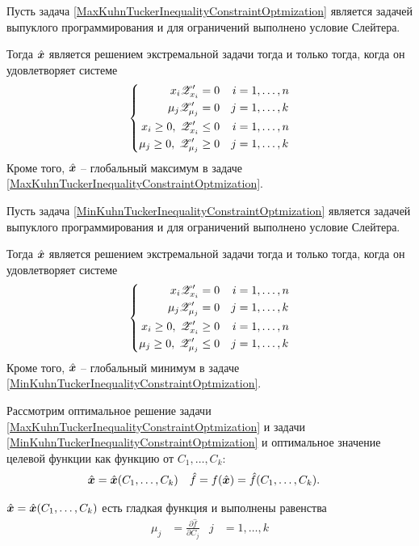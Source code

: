 \begin{teorema}%
Пусть задача \eqref{MaxKuhnTuckerInequalityConstraintOptmization} 
является задачей выпуклого программирования и для ограничений выполнено условие Слейтера.

Тогда $\hat{{\bm x}}$ является решением экстремальной 
задачи тогда и только тогда, когда он удовлетворяет системе 
\begin{equation}\label{MaxKuhnTuckerSystem}
	\left\{\begin{aligned}
	x_i {\mathscr Z}'_{x_i}&=0 &  i&=1,\ldots,n \\
	\mu_j{\mathscr Z}'_{\mu_j}&=0 &  j&=1,\ldots,k\\
	x_i\geq0,\; {\mathscr Z}'_{x_i}&\leq0 &  i&=1,\ldots,n \\
	\mu_j\geq0,\; {\mathscr Z}'_{\mu_j}&\geq 0 &  j&=1,\ldots,k
	\end{aligned}\right.
\end{equation}
Кроме того, $\hat{{\bm x}}$ -- глобальный максимум в задаче  \eqref{MaxKuhnTuckerInequalityConstraintOptmization}.
\end{teorema}

\begin{teorema}%
Пусть задача \eqref{MinKuhnTuckerInequalityConstraintOptmization} 
является задачей выпуклого программирования и для ограничений выполнено условие Слейтера.

Тогда $\hat{{\bm x}}$ является решением экстремальной 
задачи тогда и только тогда, когда он удовлетворяет системе 
\begin{equation}\label{MinKuhnTuckerSystem}
	\left\{\begin{aligned}
	x_i{\mathscr Z}'_{x_i}&=0 & i&=1,\ldots,n \\
	\mu_j{\mathscr Z}'_{\mu_j}&=0 & j&=1,\ldots,k \\
	x_i\geq0,\; {\mathscr Z}'_{x_i}&\geq0 & i&=1,\ldots,n \\
	\mu_j\geq0,\; {\mathscr Z}'_{\mu_j}& \leq0 & j&=1,\ldots,k 
	\end{aligned}\right.
\end{equation}
Кроме того, $\hat{{\bm x}}$ -- глобальный минимум в задаче  \eqref{MinKuhnTuckerInequalityConstraintOptmization}.
\end{teorema}
Рассмотрим оптимальное решение задачи \eqref{MaxKuhnTuckerInequalityConstraintOptmization} и задачи 
\eqref{MinKuhnTuckerInequalityConstraintOptmization} и оптимальное значение целевой функции
как функцию от  $C_1,\ldots,C_k$: 
\begin{align*}
	\hat{{\bm x}}&=\hat{{\bm x}}(C_1,\ldots,C_k) & 
	\hat{f}&=f(\hat{{\bm x}})=\hat{f}(C_1,\ldots,C_k).
\end{align*}
\begin{teorema}
$\hat{{\bm x}}=\hat{{\bm x}}(C_1,\ldots,C_k)$ есть гладкая функция и выполнены равенства
\begin{align*}
	\mu_j&=\frac{\partial \hat{f}}{\partial C_j} & j&=1,\ldots,k
\end{align*}
\end{teorema}